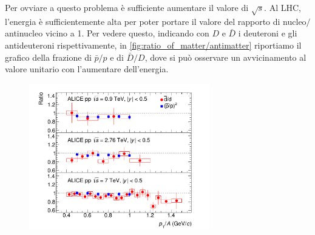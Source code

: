 Per ovviare a questo problema è sufficiente aumentare il valore di $\sqrt s$.
Al LHC, l'energia è sufficientemente alta per poter portare il valore del rapporto di nucleo$/$antinucleo vicino a 1.
Per vedere questo, indicando con $D$ e $\bar D$ i deuteroni e gli antideuteroni rispettivamente, in \autoref{fig:ratio_of_matter/antimatter} riportiamo il grafico della frazione di $\bar p/p$ e di $\bar D/D$, dove si può osservare un avvicinamento al valore unitario con l'aumentare dell'energia.
\begin{figure}[htb]
    \centering
    \includegraphics[width=0.7\textwidth]{image/1-alice/DbarDRatio.pdf}
    \label{fig:ratio_of_matter/antimatter}
\end{figure}
